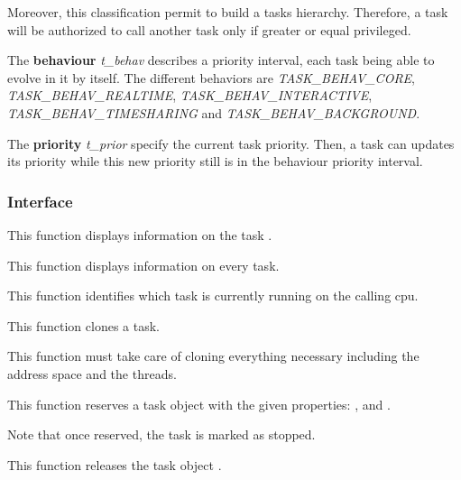 Moreover, this classification permit to build a tasks hierarchy.
Therefore, a task will be authorized to call another task only if
greater or equal privileged.


The \textbf{behaviour} \textit{t\_behav} describes a priority
interval, each task being able to evolve in it by itself. The different
behaviors are \textit{TASK\_BEHAV\_CORE}, \textit{TASK\_BEHAV\_REALTIME},
\textit{TASK\_BEHAV\_INTERACTIVE}, \textit{TASK\_BEHAV\_TIMESHARING}
and \textit{TASK\_BEHAV\_BACKGROUND}.

The \textbf{priority} \textit{t\_prior} specify the current task
priority. Then, a task can updates its priority while this new priority
still is in the behaviour priority interval.

%
%

\subsubsection{Interface}

	 {
	   This function displays information on the task .
	 }

	 {
	   This function displays information on every task.
	 }

	 {
	   This function identifies which task is currently running
	   on the calling cpu.
	 }

	 {
	   This function clones a task.

	   This function must take care of cloning everything necessary
	   including the address space and the threads.
	 }

	 {
	   This function reserves a task object with the given
	   properties: ,  and
	   .

	   Note that once reserved, the task is marked as stopped.
	 }

	 {
	   This function releases the task object .
	 }

